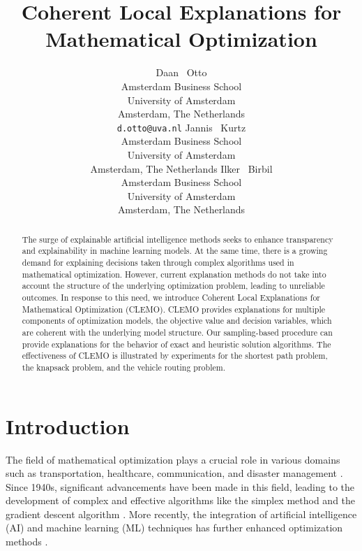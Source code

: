 \documentclass{article}
\title{Coherent Local Explanations for \\ Mathematical Optimization}
\author{%
  Daan ~Otto \\
  Amsterdam Business School\\
  University of Amsterdam\\
  Amsterdam, The Netherlands\\
  \texttt{d.otto@uva.nl}
  \And
  Jannis ~Kurtz \\
  Amsterdam Business School\\
  University of Amsterdam\\
  Amsterdam, The Netherlands
  \And
  Ilker ~Birbil \\
  Amsterdam Business School\\
  University of Amsterdam\\
  Amsterdam, The Netherlands
}
\theoremstyle{plain}
\theoremstyle{definition}
\theoremstyle{remark}
\begin{document}
\maketitle


\begin{abstract}
  The surge of explainable artificial intelligence methods seeks to enhance transparency and explainability in machine learning models. At the same time, there is a growing demand for explaining decisions taken through complex algorithms used in mathematical optimization. However, current explanation methods do not take into account the structure of the underlying optimization problem, leading to unreliable outcomes. In response to this need, we introduce Coherent Local Explanations for Mathematical Optimization (CLEMO). CLEMO provides explanations for multiple components of optimization models, the objective value and decision variables, which are coherent with the underlying model structure. Our sampling-based procedure can provide explanations for the behavior of exact and heuristic solution algorithms. The effectiveness of CLEMO is illustrated by experiments for the shortest path problem, the knapsack problem, and the vehicle routing problem.
\end{abstract}


\section{Introduction}\label{sec:Introduction}
The field of mathematical optimization plays a crucial role in various domains such as transportation, healthcare, communication, and disaster management  \cite{petropoulos2024operational}. Since 1940s, significant advancements have been made in this field, leading to the development of complex and effective algorithms like the simplex method and the gradient descent algorithm \cite{nocwright09}. 
More recently, the integration of artificial intelligence (AI) and machine learning (ML) techniques has further enhanced optimization methods \cite{bengio2021machine,scavuzzo2024machine}.

\end{document}
